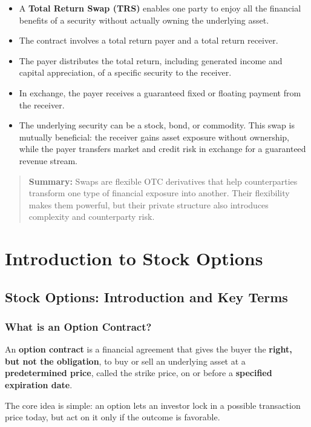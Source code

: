 \documentclass[12pt,openany]{book}
\begin{document}
\begin{itemize}[leftmargin=*]
    \item A \textbf{Total Return Swap (TRS)} enables one party to enjoy all the financial benefits of a security without actually owning the underlying asset.
    \item The contract involves a total return payer and a total return receiver.
    \item The payer distributes the total return, including generated income and capital appreciation, of a specific security to the receiver.
    \item In exchange, the payer receives a guaranteed fixed or floating payment from the receiver.
    \item The underlying security can be a stock, bond, or commodity. This swap is mutually beneficial: the receiver gains asset exposure without ownership, while the payer transfers market and credit risk in exchange for a guaranteed revenue stream.
\end{itemize}

\begin{quote}
\textbf{Summary:} Swaps are flexible OTC derivatives that help counterparties transform one type of financial exposure into another. Their flexibility makes them powerful, but their private structure also introduces complexity and counterparty risk.
\end{quote}


\section{Introduction to Stock Options}

\subsection{Stock Options: Introduction and Key Terms}

\subsubsection{What is an Option Contract?}

An \textbf{option contract} is a financial agreement that gives the buyer the \textbf{right, but not the obligation}, to buy or sell an underlying asset at a \textbf{predetermined price}, called the strike price, on or before a \textbf{specified expiration date}.

The core idea is simple: an option lets an investor lock in a possible transaction price today, but act on it only if the outcome is favorable.
\end{document}
